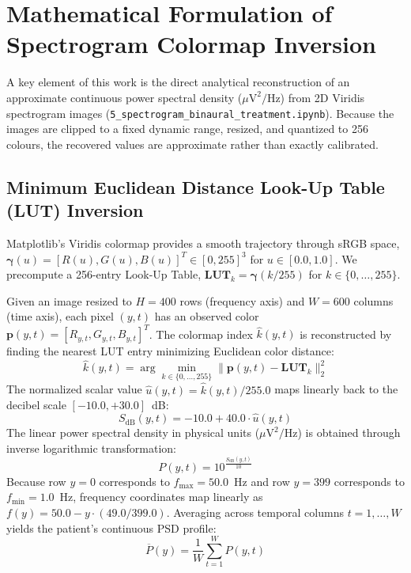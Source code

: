 \documentclass[12pt, a4paper]{report}
\begin{document}
\section{Mathematical Formulation of Spectrogram Colormap Inversion}
\label{sec:colormap_inversion}
A key element of this work is the direct analytical reconstruction of an approximate continuous power spectral density ($\mu\text{V}^2/\text{Hz}$) from 2D Viridis spectrogram images (\texttt{5\_spectrogram\_binaural\_treatment.ipynb}). Because the images are clipped to a fixed dynamic range, resized, and quantized to 256 colours, the recovered values are approximate rather than exactly calibrated.

\subsection{Minimum Euclidean Distance Look-Up Table (LUT) Inversion}
Matplotlib's Viridis colormap provides a smooth trajectory through sRGB space, $\boldsymbol{\gamma}(u) = [R(u), G(u), B(u)]^T \in [0, 255]^3$ for $u \in [0.0, 1.0]$. We precompute a 256-entry Look-Up Table, $\mathbf{LUT}_k = \boldsymbol{\gamma}(k/255)$ for $k \in \{0, \dots, 255\}$.

Given an image resized to $H = 400$ rows (frequency axis) and $W = 600$ columns (time axis), each pixel $(y, t)$ has an observed color $\mathbf{p}(y, t) = [R_{y, t}, G_{y, t}, B_{y, t}]^T$. The colormap index $\hat{k}(y, t)$ is reconstructed by finding the nearest LUT entry minimizing Euclidean color distance:
\begin{equation}
    \hat{k}(y, t) = \arg\min_{k \in \{0, \dots, 255\}} \|\mathbf{p}(y, t) - \mathbf{LUT}_k\|_2^2
    \label{eq:lut_argmin}
\end{equation}
The normalized scalar value $\hat{u}(y, t) = \hat{k}(y, t) / 255.0$ maps linearly back to the decibel scale $[-10.0, +30.0]$~dB:
\begin{equation}
    S_{\text{dB}}(y, t) = -10.0 + 40.0 \cdot \hat{u}(y, t)
    \label{eq:db_reconstruction}
\end{equation}
The linear power spectral density in physical units ($\mu\text{V}^2/\text{Hz}$) is obtained through inverse logarithmic transformation:
\begin{equation}
    P(y, t) = 10^{\frac{S_{\text{dB}}(y, t)}{10}}
    \label{eq:linear_power}
\end{equation}
Because row $y = 0$ corresponds to $f_{\max} = 50.0$~Hz and row $y = 399$ corresponds to $f_{\min} = 1.0$~Hz, frequency coordinates map linearly as $f(y) = 50.0 - y \cdot (49.0 / 399.0)$. Averaging across temporal columns $t = 1, \dots, W$ yields the patient's continuous PSD profile:
\begin{equation}
    \overline{P}(y) = \frac{1}{W} \sum_{t=1}^W P(y, t)
    \label{eq:psd_profile}
\end{equation}
\end{document}
